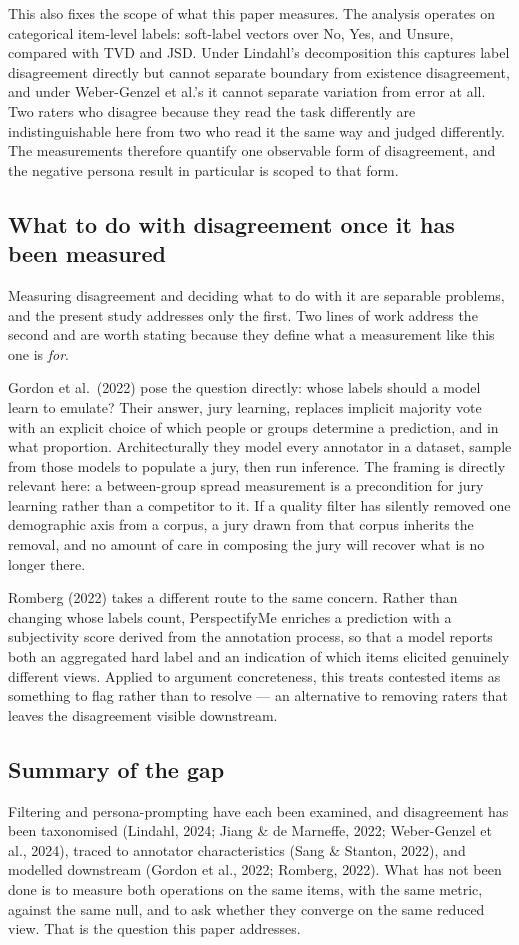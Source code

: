 This also fixes the scope of what this paper measures. The analysis operates on categorical
item-level labels: soft-label vectors over No, Yes, and Unsure, compared with TVD and JSD.
Under Lindahl's decomposition this captures label disagreement directly but cannot separate
boundary from existence disagreement, and under Weber-Genzel et al.'s it cannot separate
variation from error at all. Two raters who disagree because they read the task differently are
indistinguishable here from two who read it the same way and judged differently. The measurements
therefore quantify one observable form of disagreement, and the negative persona result in
particular is scoped to that form.

\subsection{What to do with disagreement once it has been measured}
\label{sec:whattodo}

Measuring disagreement and deciding what to do with it are separable problems, and the present
study addresses only the first. Two lines of work address the second and are worth stating
because they define what a measurement like this one is \emph{for}.

Gordon et al.\ (2022) pose the question directly: whose labels should a model learn to emulate?
Their answer, jury learning, replaces implicit majority vote with an explicit choice of which
people or groups determine a prediction, and in what proportion. Architecturally they model every
annotator in a dataset, sample from those models to populate a jury, then run inference. The
framing is directly relevant here: a between-group spread measurement is a precondition for jury
learning rather than a competitor to it. If a quality filter has silently removed one demographic
axis from a corpus, a jury drawn from that corpus inherits the removal, and no amount of care in
composing the jury will recover what is no longer there.

Romberg (2022) takes a different route to the same concern. Rather than changing whose labels
count, PerspectifyMe enriches a prediction with a subjectivity score derived from the annotation
process, so that a model reports both an aggregated hard label and an indication of which items
elicited genuinely different views. Applied to argument concreteness, this treats contested items
as something to flag rather than to resolve --- an alternative to removing raters that leaves the
disagreement visible downstream.

\subsection{Summary of the gap}

Filtering and persona-prompting have each been examined, and disagreement has been taxonomised
(Lindahl, 2024; Jiang \& de Marneffe, 2022; Weber-Genzel et al., 2024), traced to annotator
characteristics (Sang \& Stanton, 2022), and modelled downstream (Gordon et al., 2022;
Romberg, 2022). What has not been done is to measure both operations on the same items, with the
same metric, against the same null, and to ask whether they converge on the same reduced view.
That is the question this paper addresses.

